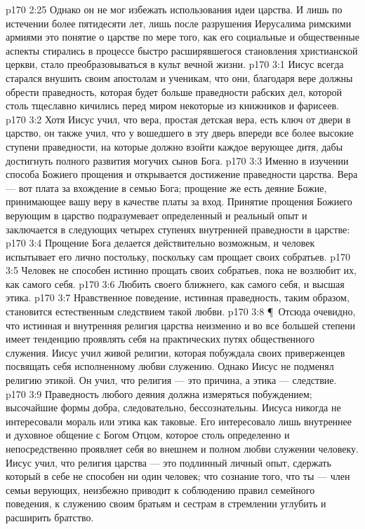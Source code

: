 \vs p170 2:25 Однако он не мог избежать использования идеи царства. И лишь по истечении более пятидесяти лет, лишь после разрушения Иерусалима римскими армиями это понятие о царстве по мере того, как его социальные и общественные аспекты стирались в процессе быстро расширявшегося становления христианской церкви, стало преобразовываться в культ вечной жизни.
\vs p170 3:1 Иисус всегда старался внушить своим апостолам и ученикам, что они, благодаря вере должны обрести праведность, которая будет больше праведности рабских дел, которой столь тщеславно кичились перед миром некоторые из книжников и фарисеев.
\vs p170 3:2 Хотя Иисус учил, что вера, простая детская вера, есть ключ от двери в царство, он также учил, что у вошедшего в эту дверь впереди все более высокие ступени праведности, на которые должно взойти каждое верующее дитя, дабы достигнуть полного развития могучих сынов Бога.
\vs p170 3:3 Именно в изучении способа  Божиего прощения и открывается достижение праведности царства. Вера --- вот плата за вхождение в семью Бога; прощение же есть деяние Божие, принимающее вашу веру в качестве платы за вход. Принятие прощения Божиего верующим в царство подразумевает определенный и реальный опыт и заключается в следующих четырех ступенях внутренней праведности в царстве:
\vs p170 3:4 \bibnobreakspace Прощение Бога делается действительно возможным, и человек испытывает его лично постольку, поскольку сам прощает своих собратьев.
\vs p170 3:5 \bibnobreakspace Человек не способен истинно прощать своих собратьев, пока не возлюбит их, как самого себя.
\vs p170 3:6 \bibnobreakspace Любить своего ближнего, как самого себя, и  высшая этика.
\vs p170 3:7 \bibnobreakspace Нравственное поведение, истинная праведность, таким образом, становится естественным следствием такой любви.
\vs p170 3:8 \P\ Отсюда очевидно, что истинная и внутренняя религия царства неизменно и во все большей степени имеет тенденцию проявлять себя на практических путях общественного служения. Иисус учил живой религии, которая побуждала своих приверженцев посвящать себя исполненному любви служению. Однако Иисус не подменял религию этикой. Он учил, что религия --- это причина, а этика --- следствие.
\vs p170 3:9 Праведность любого деяния должна измеряться побуждением; высочайшие формы добра, следовательно, бессознательны. Иисуса никогда не интересовали мораль или этика как таковые. Его интересовало лишь внутреннее и духовное общение с Богом Отцом, которое столь определенно и непосредственно проявляет себя во внешнем и полном любви служении человеку. Иисус учил, что религия царства --- это подлинный личный опыт, сдержать который в себе не способен ни один человек; что сознание того, что ты --- член семьи верующих, неизбежно приводит к соблюдению правил семейного поведения, к служению своим братьям и сестрам в стремлении углубить и расширить братство.
